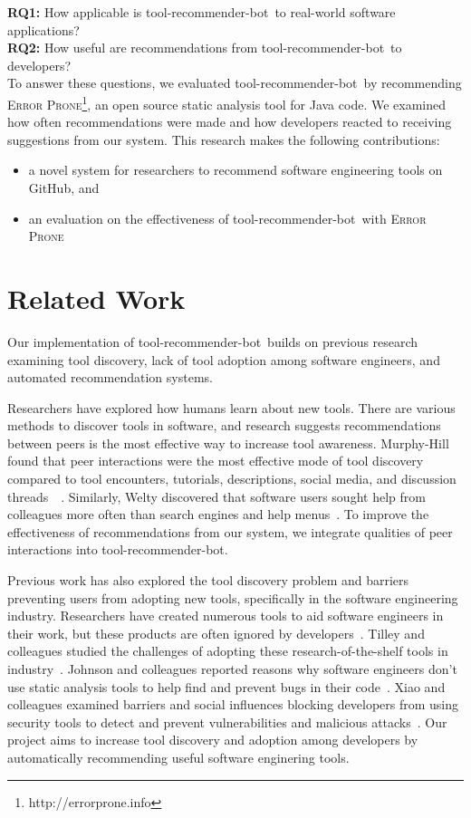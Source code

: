 \documentclass[conference]{IEEEtran}
\newcommand{\tool}{tool-recommender-bot}
\begin{document}
\noindent
\textbf{RQ1:} How applicable is \tool~to real-world software applications?  \\ 
\textbf{RQ2:} How useful are recommendations from \tool~to developers?  \\

To answer these questions, we evaluated \tool~by recommending \textsc{Error Prone}\footnote{http://errorprone.info}, an open source static analysis tool for Java code. We examined how often recommendations were made and how developers reacted to receiving suggestions from our system. This research makes the following contributions:

\begin{itemize}
 \item a novel system for researchers to recommend software engineering tools on GitHub, and
 \item an evaluation on the effectiveness of \tool~with \textsc{Error Prone}
 \end{itemize}

\section{Related Work}

Our implementation of \tool~builds on previous research examining tool discovery, lack of tool adoption among software engineers, and automated recommendation systems.

Researchers have explored how humans learn about new tools. There are various methods to discover tools in software, and research suggests recommendations between peers is the most effective way to increase tool awareness. Murphy-Hill found that peer interactions were the most effective mode of tool discovery compared to tool encounters, tutorials, descriptions, social media, and discussion threads~\cite{MurphyHill2011PeerInteraction}~\cite{Murphy-Hill2015HowDoUsers}. Similarly, Welty discovered that software users sought help from colleagues more often than search engines and help menus~\cite{Welty2011Help}. To improve the effectiveness of recommendations from our system, we integrate qualities of peer interactions into \tool.

Previous work has also explored the tool discovery problem and barriers preventing users from adopting new tools, specifically in the software engineering industry. Researchers have created numerous tools to aid software engineers in their work, but these products are often ignored by developers~\cite{Ivanov2017Gaps}. Tilley and colleagues studied the challenges of adopting these research-of-the-shelf tools in industry~\cite{Tilley2003ROTS}. Johnson and colleagues reported reasons why software engineers don't use static analysis tools to help find and prevent bugs in their code~\cite{Johnson2013Why}. Xiao and colleagues examined barriers and social influences blocking developers from using security tools to detect and prevent vulnerabilities and malicious attacks~\cite{Xiao2014Security}. Our project aims to increase tool discovery and adoption among developers by automatically recommending useful software enginering tools.
\end{document}
